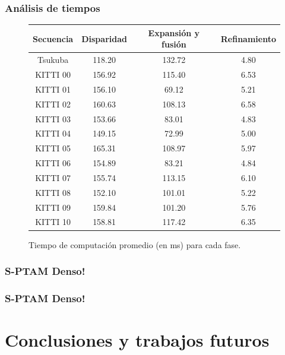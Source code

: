 \documentclass[compress]{beamer}
\begin{document}
\begin{frame}
	\frametitle{Análisis de tiempos}
	\vspace{-0.7em}
	\begin{center}
	\begin{figure}[tbh]
	\begin{centering}
	\begin{tabular}{cccc}
		\toprule 
		Secuencia & Disparidad & Expansión y fusión & Refinamiento\tabularnewline
		\midrule
		\midrule 
		Tsukuba & 118.20 & 132.72 & 4.80\tabularnewline
		\midrule 
		KITTI 00 & 156.92 & 115.40 & 6.53\tabularnewline
		\midrule 
		KITTI 01 & 156.10 & 69.12 & 5.21\tabularnewline
		\midrule 
		KITTI 02 & 160.63 & 108.13 & 6.58\tabularnewline
		\midrule 
		KITTI 03 & 153.66 & 83.01 & 4.83\tabularnewline
		\midrule 
		KITTI 04 & 149.15 & 72.99 & 5.00\tabularnewline
		\midrule 
		KITTI 05 & 165.31 & 108.97 & 5.97\tabularnewline
		\midrule 
		KITTI 06 & 154.89 & 83.21 & 4.84\tabularnewline
		\midrule 
		KITTI 07 & 155.74 & 113.15 & 6.10\tabularnewline
		\midrule 
		KITTI 08 & 152.10 & 101.01 & 5.22\tabularnewline
		\midrule 
		KITTI 09 & 159.84 & 101.20 & 5.76\tabularnewline
		\midrule 
		KITTI 10 & 158.81 & 117.42 & 6.35\tabularnewline
		\bottomrule
	\end{tabular}
	\par\end{centering}
	\centering
	\caption{Tiempo de computación promedio (en ms) para cada fase.}
	\end{figure}
	\par\end{center}
\end{frame}


\begin{frame}
	\frametitle{S-PTAM Denso!}
	\centering
\end{frame}


\begin{frame}
	\frametitle{S-PTAM Denso!}
	\centering
\end{frame}


\section{Conclusiones y trabajos futuros}
\end{document}
